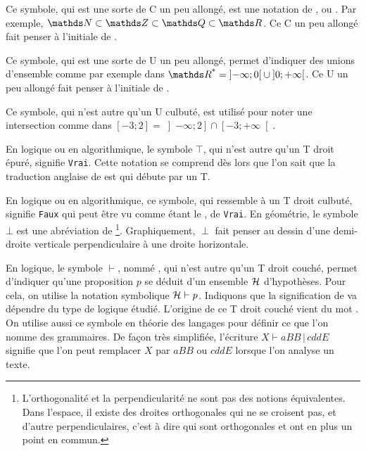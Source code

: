 
\cadre{$\subset$} Ce symbole, qui est une sorte de C un peu allongé, est une notation
de , ou . Par exemple, 
$\NN \subset \ZZ \subset \QQ \subset \RR$. Ce C un peu allongé fait penser à l'initiale
de .


\cadre{$\cup$} Ce symbole, qui est une sorte de U un peu allongé, permet d'indiquer
des unions d'ensemble comme par exemple dans 
$\RR^\text{*} = \left] -\infty ; 0 \right[ \cup \left] 0 ; +\infty \right[$.
Ce U un peu allongé fait penser à l'initiale de .


\cadre{$\cap$} Ce symbole, qui n'est autre qu'un U culbuté, est utilisé pour noter une intersection comme dans
$\left[ -3 ; 2 \right] = \left] -\infty ; 2 \right] \cap \left[ -3 ; +\infty \right[$.


\cadre{$\top$} En logique ou en algorithmique, le symbole $\top$, qui n'est autre qu'un T droit épuré, signifie \verb+Vrai+. Cette notation se comprend dès lors que l'on sait que la traduction anglaise de  est  qui débute par un T.


\cadre{$\perp$} 
En logique ou en algorithmique, ce symbole, qui ressemble à un T droit culbuté, signifie \verb+Faux+ qui peut être vu comme étant le ,  de \verb+Vrai+.
En géométrie, le symbole $\bot$ est une abréviation de  
\footnote{
	L'orthogonalité et la perpendicularité ne sont pas des notions équivalentes. Dans l'espace, il existe des droites orthogonales qui ne se croisent pas, et d'autre perpendiculaires, c'est à dire qui sont orthogonales et ont en plus un point en commun.
}.
Graphiquement, $\perp$ fait penser au dessin d'une demi-droite verticale perpendiculaire à une droite horizontale.


\cadre{$\vdash$} En logique, le symbole $\vdash$, nommé , qui n'est autre qu'un T droit couché, permet d'indiquer qu'une proposition $p$ se déduit d'un ensemble $\cal H$ d'hypothèses. Pour cela, on utilise la notation symbolique ${\cal H} \vdash p$. Indiquons que la signification de  va dépendre du type de logique étudié. L'origine de ce T droit couché vient du mot . On utilise aussi ce symbole en théorie des langages pour définir ce que l'on nomme des grammaires. De façon très simplifiée, l'écriture $X \vdash aBB \,|\, cddE$ signifie que l'on peut remplacer $X$ par $aBB$ ou $cddE$ lorsque l'on analyse un texte.


